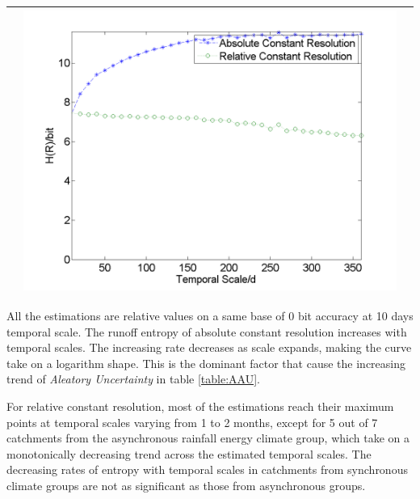 \documentclass[draft,wrr]{AGUTeX}
\begin{document}
\begin{article}
\begin{table}[H]
{\begin{tabular}{ccc}
&\begin{minipage}{.6\textwidth}\includegraphics[width=\linewidth]{resultgraph/e11532500.png}\end{minipage}
\\
\hline
\end{tabular}
}
\end{table}

All the estimations are relative values on a same base of 0 bit accuracy at 10 days temporal scale. The runoff entropy of absolute constant resolution increases with temporal scales. The increasing rate decreases as scale expands, making the  curve take on a logarithm shape. This is the dominant factor that cause the increasing trend of \emph{Aleatory Uncertainty} in table \ref{table:AAU}. 

For relative constant resolution, most of the estimations reach their maximum points at temporal scales varying from    
1 to 2 months, except for 5 out of 7 catchments from the asynchronous rainfall energy climate group, which take on a monotonically decreasing trend across the estimated temporal scales. The decreasing rates of entropy with temporal scales in catchments from synchronous climate groups are not as significant as those from asynchronous groups. 

\end{article}
\end{document}
